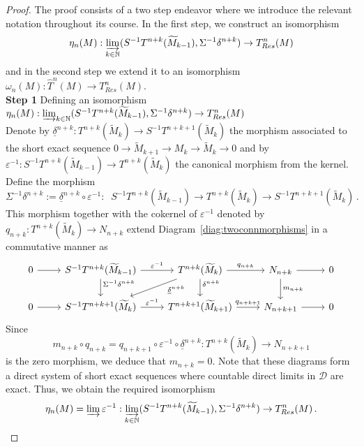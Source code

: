 \documentclass[12pt,a4paper]{article}
\numberwithin{equation}{section}
\theoremstyle{nonumberplain}
\newtheorem{proof}{Proof}
\begin{document}
\begin{proof}
The proof consists of a two step endeavor where we introduce the relevant notation throughout its course. In the first step, we construct an isomorphism
\[ \eta_n(M): \varinjlim_{k \in \mathbb{N}} (S^{-1}T^{n+k}(\widetilde{M}_{k-1}), \Sigma^{-1}\delta^{n+k}) \rightarrow T_{Res}^n(M) \]
and in the second step we extend it to an isomorphism $\omega_n(M): \widehat{T}^n(M) \rightarrow T_{Res}^n(M)$. \\

{\textbf{Step 1}} Defining an isomorphism $\eta_n(M): \varinjlim_{k \in \mathbb{N}} (S^{-1}T^{n+k}(\widetilde{M}_{k-1}), \Sigma^{-1}\delta^{n+k}) \rightarrow T_{Res}^n(M)$ \\

Denote by $\underline{\delta}^{n+k}: T^{n+k}(\widetilde{M}_k) \rightarrow S^{-1}T^{n+k+1}(\widetilde{M}_k)$ the morphism associated to the short exact sequence $0 \rightarrow \widetilde{M}_{k+1} \rightarrow M_k \rightarrow \widetilde{M}_k \rightarrow 0$ and by $\varepsilon^{-1}: S^{-1}T^{n+k}(\widetilde{M}_{k-1}) \rightarrow T^{n+k}(\widetilde{M}_k)$ the canonical morphism from the kernel. Define the morphism
\[ \Sigma^{-1}\delta^{n+k} := \underline{\delta}^{n+k} \circ \varepsilon^{-1}: \; \; S^{-1}T^{n+k}(\widetilde{M}_{k-1}) \rightarrow T^{n+k}(\widetilde{M}_k) \rightarrow S^{-1}T^{n+k+1}(\widetilde{M}_k) \, . \]
This morphism together with the cokernel of $\varepsilon^{-1}$ denoted by $q_{n+k}: T^{n+k}(\widetilde{M}_k) \rightarrow N_{n+k}$ extend Diagram~\ref{diag:twoconnmorphisms} in a commutative manner as
\begin{equation}\label{diag:cokernels}
\begin{tikzcd}
  0 \arrow[r]
    & S^{-1}T^{n+k}(\widetilde{M}_{k-1}) \arrow[r, "\varepsilon^{-1}"] \arrow[d, "\Sigma^{-1}\delta^{n+k}" near start]
    & T^{n+k}(\widetilde{M}_k) \arrow[r, "q_{n+k}"] \arrow[dl, "\underline{\delta}^{n+k}" near start] \arrow[d, "\delta^{n+k}" near start]
    & N_{n+k} \arrow[r] \arrow[d, "m_{n+k}"]
    & 0 \\
  0 \arrow[r]
    & S^{-1}T^{n+k+1}(\widetilde{M}_k) \arrow[r, "\varepsilon^{-1}"]
    & T^{n+k+1}(\widetilde{M}_{k+1}) \arrow[r, "q_{n+k+1}"]
    & N_{n+k+1} \arrow[r]
    & 0
\end{tikzcd}
\end{equation}
Since
\[ m_{n+k} \circ q_{n+k} = q_{n+k+1} \circ \varepsilon^{-1} \circ \underline{\delta}^{n+k}: T^{n+k}(\widetilde{M}_k) \rightarrow N_{n+k+1} \]
is the zero morphism, we deduce that $m_{n+k} = 0$. Note that these diagrams form a direct system of short exact sequences where countable direct limits in $\mathcal{D}$ are exact. Thus, we obtain the required isomorphism
\[ \eta_n(M) = \varinjlim \varepsilon^{-1}: \varinjlim_{k \in \mathbb{N}} (S^{-1}T^{n+k}(\widetilde{M}_{k-1}), \Sigma^{-1}\delta^{n+k}) \rightarrow T_{Res}^n(M) \, . \]


\end{proof}
\end{document}
